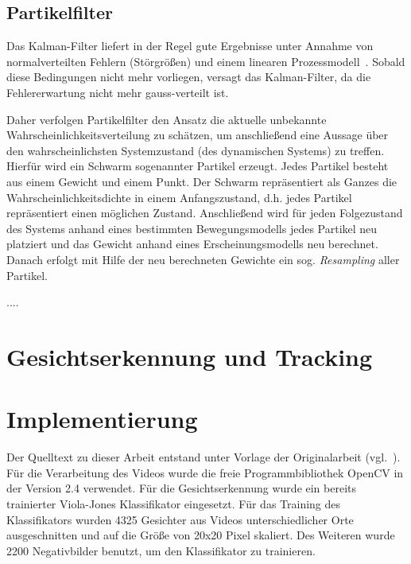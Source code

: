 \documentclass[a4paper, 11pt, twocolumn]{article}
\begin{document}

\subsection{Partikelfilter} %
\label{sub:partikelfilter}

Das Kalman-Filter liefert in der Regel gute Ergebnisse unter Annahme von normalverteilten Fehlern (Störgrößen) und einem linearen Prozessmodell~\cite{MarslandBook}. Sobald diese Bedingungen nicht mehr vorliegen, versagt das Kalman-Filter, da die Fehlererwartung nicht mehr gauss-verteilt ist.

Daher verfolgen Partikelfilter den Ansatz die aktuelle unbekannte Wahrscheinlichkeitsverteilung zu schätzen, um anschließend eine Aussage über den wahrscheinlichsten Systemzustand (des dynamischen Systems) zu treffen\cite{Doucet2009}. Hierfür wird ein Schwarm sogenannter Partikel erzeugt. Jedes Partikel besteht aus einem Gewicht und einem Punkt. Der Schwarm repräsentiert als Ganzes die Wahrscheinlichkeitsdichte in einem Anfangszustand, d.h. jedes Partikel repräsentiert einen möglichen Zustand. Anschließend wird für jeden Folgezustand des Systems anhand eines bestimmten Bewegungsmodells jedes Partikel neu platziert und das Gewicht anhand eines Erscheinungsmodells neu berechnet. Danach erfolgt mit Hilfe der neu berechneten Gewichte ein sog. \emph{Resampling} aller Partikel.

....


\section{Gesichtserkennung und Tracking} %
\label{sec:gesichtserkennung_und_tracking}



\section{Implementierung} %
\label{sec:implementierung}

Der Quelltext zu dieser Arbeit entstand unter Vorlage der Originalarbeit (vgl.~\cite{aliMultipleHuman}). Für die Verarbeitung des Videos wurde die freie Programmbibliothek OpenCV in der Version 2.4 verwendet.
Für die Gesichtserkennung wurde ein bereits trainierter Viola-Jones Klassifikator eingesetzt.
Für das Training des Klassifikators wurden 4325 Gesichter aus Videos unterschiedlicher Orte ausgeschnitten und auf die Größe von 20x20 Pixel skaliert. Des Weiteren wurde 2200 Negativbilder benutzt, um den Klassifikator zu trainieren.
\end{document}
